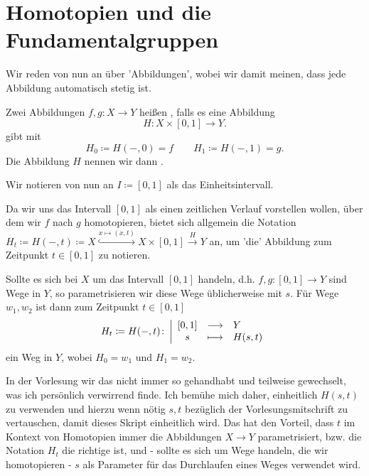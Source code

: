 \section{Homotopien und die Fundamentalgruppen}
\begin{oral}
    Wir reden von nun an über 'Abbildungen', wobei wir damit meinen, dass jede Abbildung automatisch stetig ist.
\end{oral}

\begin{definition}[Homotopie]\label{def:homotop}
    Zwei Abbildungen $f,g\colon  X \to  Y$ heißen , falls es eine Abbildung
    \[
        H \colon  X \times [0,1] \to  Y
    .\] 
    gibt mit 
    \[
        H_0 \coloneqq  H(-,0) = f \qquad H_1 \coloneqq H(-,1) = g
    .\] 
    Die Abbildung $H$ nennen wir dann  . 
\end{definition}

\begin{dnotation}
    Wir notieren von nun an $I \coloneqq  [0,1]$ als das Einheitsintervall.
\end{dnotation}

\begin{notation**}
    Da wir uns das Intervall $[0,1]$ als einen zeitlichen Verlauf vorstellen wollen, über dem wir  $f$ nach  $g$ homotopieren, bietet sich allgemein die Notation  $H_t \coloneqq  H(-,t) \coloneqq  X \stackrel{x \mapsto (x,t)}{\hookrightarrow} X \times [0,1] \stackrel{H}{\longrightarrow}   Y$ an, um 'die' Abbildung zum Zeitpunkt $t\in [0,1]$ zu notieren. 

    Sollte es sich bei $X$ um das Intervall  $[0,1]$ handeln, d.h.  $f,g\colon [0,1] \to  Y$ sind Wege in $Y$, so parametrisieren wir diese Wege üblicherweise mit $s$. Für Wege  $w_1,w_2$  ist dann zum Zeitpunkt $t\in [0,1]$
        \begin{equation*}
            H_t \coloneqq H(-,t)\colon  \left| \begin{array}{c c l} 
            [0,1] & \longrightarrow & Y \\
        s & \longmapsto &  H(s,t)
        \end{array} \right.
    \end{equation*}
   ein Weg in $Y$, wobei  $H_0 = w_1$ und $H_1 = w_2$.

   In der Vorlesung wir das nicht immer so gehandhabt und teilweise gewechselt, was ich persönlich verwirrend finde. Ich bemühe mich daher, einheitlich $H(s,t)$ zu verwenden und hierzu wenn nötig  $s,t$ bezüglich der Vorlesungsmitschrift zu vertauschen, damit dieses Skript einheitlich wird. Das hat den Vorteil, dass  $t$ im Kontext von Homotopien immer die Abbildungen  $X\to Y$ parametrisiert, bzw. die Notation $H_t$ die richtige ist, und - sollte es sich um Wege handeln, die wir homotopieren -  $s$ als Parameter für das Durchlaufen eines Weges verwendet wird.
\end{notation**}

